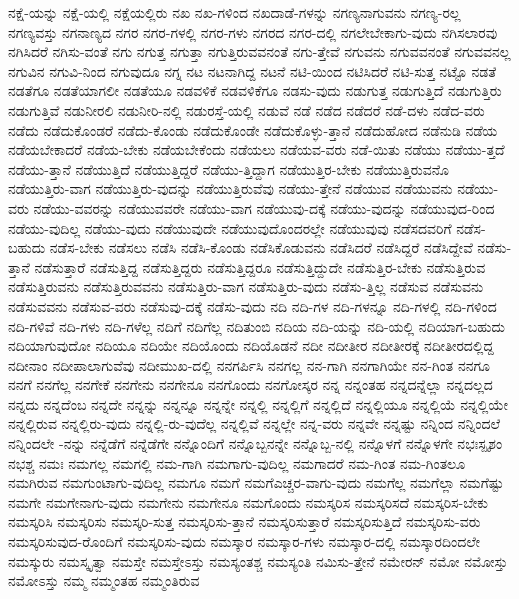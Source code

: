 {ನಕ್ಷೆ-ಯನ್ನು
ನಕ್ಷೆ-ಯಲ್ಲಿ
ನಕ್ಷೆಯಲ್ಲಿರು
ನಖ
ನಖ-ಗಳಿಂದ
ನಖದಾಡೆ-ಗಳನ್ನು
ನಗಣ್ಯನಾಗುವನು
ನಗಣ್ಯ-ರಲ್ಲ
ನಗಣ್ಯವಸ್ತು
ನಗನಾಣ್ಯದ
ನಗರ
ನಗರ-ಗಳಲ್ಲಿ
ನಗರ-ಗಳು
ನಗರದ
ನಗರ-ದಲ್ಲಿ
ನಗಲೇಬೇಕಾಗು-ವುದು
ನಗಿಸಲಾರವು
ನಗಿಸಿದರೆ
ನಗಿಸು-ವಂತೆ
ನಗು
ನಗುತ್ತ
ನಗುತ್ತಾ
ನಗುತ್ತಿರುವವನಂತೆ
ನಗು-ತ್ತೇವೆ
ನಗುವನು
ನಗುವವನಂತೆ
ನಗುವವನಲ್ಲ
ನಗುವಿನ
ನಗುವಿ-ನಿಂದ
ನಗುವುದೂ
ನಗ್ನ
ನಟ
ನಟನಾಗಿದ್ದ
ನಟನೆ
ನಟಿ-ಯಿಂದ
ನಟಿಸಿದರೆ
ನಟಿ-ಸುತ್ತ
ನಟ್ಟೊ
ನಡತೆ
ನಡತೆಗೂ
ನಡತೆಯಾಗಲೀ
ನಡತೆಯೂ
ನಡವಳಿಕೆ
ನಡವಳಿಕೆಗೂ
ನಡಸು-ವುದು
ನಡುಗುತ್ತ
ನಡುಗುತ್ತಿದೆ
ನಡುಗುತ್ತಿರು
ನಡುಗುತ್ತಿವೆ
ನಡುನೀರಲಿ
ನಡುನೀರಿ-ನಲ್ಲಿ
ನಡುರಸ್ತೆ-ಯಲ್ಲಿ
ನಡುವೆ
ನಡೆ
ನಡೆದ
ನಡೆದರೆ
ನಡೆ-ದಳು
ನಡೆದ-ವರು
ನಡೆದು
ನಡೆದುಕೊಂಡರೆ
ನಡೆದು-ಕೊಂಡು
ನಡೆದುಕೊಂಡೇ
ನಡೆದುಕೊಳ್ಳು-ತ್ತಾನೆ
ನಡೆದುಹೋದ
ನಡೆನುಡಿ
ನಡೆಯ
ನಡೆಯಬೇಕಾದರೆ
ನಡೆಯ-ಬೇಕು
ನಡೆಯಬೇಕೆಂದು
ನಡೆಯಲು
ನಡೆಯವ-ವರು
ನಡೆ-ಯಿತು
ನಡೆಯು
ನಡೆಯು-ತ್ತದೆ
ನಡೆಯು-ತ್ತಾನೆ
ನಡೆಯುತ್ತಿದೆ
ನಡೆಯುತ್ತಿದ್ದರೆ
ನಡೆಯು-ತ್ತಿದ್ದಾಗ
ನಡೆಯುತ್ತಿರ-ಬೇಕು
ನಡೆಯುತ್ತಿರುವನೊ
ನಡೆಯುತ್ತಿರು-ವಾಗ
ನಡೆಯುತ್ತಿರು-ವುದನ್ನು
ನಡೆಯುತ್ತಿರುವೆವು
ನಡೆಯು-ತ್ತೇನೆ
ನಡೆಯುವ
ನಡೆಯುವನು
ನಡೆಯು-ವರು
ನಡೆಯು-ವವರನ್ನು
ನಡೆಯುವವರೇ
ನಡೆಯು-ವಾಗ
ನಡೆಯುವು-ದಕ್ಕೆ
ನಡೆಯು-ವುದನ್ನು
ನಡೆಯುವುದ-ರಿಂದ
ನಡೆಯು-ವುದಿಲ್ಲ
ನಡೆಯು-ವುದು
ನಡೆಯುವುದೇ
ನಡೆಯುವುದೊಂದರಲ್ಲೇ
ನಡೆಯುವುವು
ನಡೆಸದವರಿಗೆ
ನಡೆಸ-ಬಹುದು
ನಡೆಸ-ಬೇಕು
ನಡೆಸಲು
ನಡೆಸಿ
ನಡೆಸಿ-ಕೊಂಡು
ನಡೆಸಿಕೊಡುವನು
ನಡೆಸಿದರೆ
ನಡೆಸಿದ್ದರೆ
ನಡೆಸಿದ್ದೇವೆ
ನಡೆಸು-ತ್ತಾನೆ
ನಡೆಸುತ್ತಾರೆ
ನಡೆಸುತ್ತಿದ್ದ
ನಡೆಸುತ್ತಿದ್ದರು
ನಡೆಸುತ್ತಿದ್ದರೂ
ನಡೆಸುತ್ತಿದ್ದುದೇ
ನಡೆಸುತ್ತಿರ-ಬೇಕು
ನಡೆಸುತ್ತಿರುವ
ನಡೆಸುತ್ತಿರುವನು
ನಡೆಸುತ್ತಿರುವವನು
ನಡೆಸುತ್ತಿರು-ವಾಗ
ನಡೆಸುತ್ತಿರು-ವುದು
ನಡೆಸು-ತ್ತಿಲ್ಲ
ನಡೆಸುವ
ನಡೆಸುವನು
ನಡೆಸುವವನು
ನಡೆಸುವ-ವರು
ನಡೆಸುವು-ದಕ್ಕೆ
ನಡೆಸು-ವುದು
ನದಿ
ನದಿ-ಗಳ
ನದಿ-ಗಳನ್ನೂ
ನದಿ-ಗಳಲ್ಲಿ
ನದಿ-ಗಳಿಂದ
ನದಿ-ಗಳಿವೆ
ನದಿ-ಗಳು
ನದಿ-ಗಳೆಲ್ಲ
ನದಿಗೆ
ನದಿಗೆಲ್ಲ
ನದಿತುಂಬಿ
ನದಿಯ
ನದಿ-ಯನ್ನು
ನದಿ-ಯಲ್ಲಿ
ನದಿಯಾಗ-ಬಹುದು
ನದಿಯಾಗುವುದೋ
ನದಿಯೂ
ನದಿಯೇ
ನದಿಯೊಂದು
ನದಿಯೊಡನೆ
ನದೀ
ನದೀತೀರ
ನದೀತೀರಕ್ಕೆ
ನದೀತೀರದಲ್ಲಿದ್ದ
ನದೀನಾಂ
ನದೀಪಾಲಾಗುವೆವು
ನದೀಮುಖ-ದಲ್ಲಿ
ನನಗರ್ಪಿಸಿ
ನನಗಲ್ಲ
ನನ-ಗಾಗಿ
ನನಗಾಗಿಯೇ
ನನ-ಗಿಂತ
ನನಗೂ
ನನಗೆ
ನನಗೆಲ್ಲ
ನನಗೇಕೆ
ನನಗೇನು
ನನಗೇನೂ
ನನಗೊಂದು
ನನಗೋಸ್ಕರ
ನನ್ನ
ನನ್ನಂತಹ
ನನ್ನದನ್ನೆಲ್ಲಾ
ನನ್ನದಲ್ಲದ
ನನ್ನದು
ನನ್ನದೆಂಬ
ನನ್ನದೇ
ನನ್ನನ್ನು
ನನ್ನನ್ನೂ
ನನ್ನನ್ನೇ
ನನ್ನಲ್ಲಿ
ನನ್ನಲ್ಲಿಗೆ
ನನ್ನಲ್ಲಿದೆ
ನನ್ನಲ್ಲಿಯೂ
ನನ್ನಲ್ಲಿಯೆ
ನನ್ನಲ್ಲಿಯೇ
ನನ್ನಲ್ಲಿರುವ
ನನ್ನಲ್ಲಿರು-ವುದು
ನನ್ನಲ್ಲಿ-ರು-ವುದೆಲ್ಲ
ನನ್ನಲ್ಲಿವೆ
ನನ್ನಲ್ಲೇ
ನನ್ನ-ವರು
ನನ್ನವೇ
ನನ್ನಷ್ಟು
ನನ್ನಿಂದ
ನನ್ನಿಂದಲೆ
ನನ್ನಿಂದಲೇ
-ನನ್ನು
ನನ್ನೆಡೆಗೆ
ನನ್ನೆಡೆಗೇ
ನನ್ನೊಂದಿಗೆ
ನನ್ನೊಬ್ಬನನ್ನೇ
ನನ್ನೊಬ್ಬ-ನಲ್ಲಿ
ನನ್ನೊಳಗೆ
ನನ್ನೊಳಗೇ
ನಭಃಸ್ಪೃಶಂ
ನಭಶ್ಚ
ನಮಃ
ನಮಗಲ್ಲ
ನಮಗಲ್ಲಿ
ನಮ-ಗಾಗಿ
ನಮಗಾಗು-ವುದಿಲ್ಲ
ನಮಗಾದರೆ
ನಮ-ಗಿಂತ
ನಮ-ಗಿಂತಲೂ
ನಮಗಿರುವ
ನಮಗುಂಟಾಗು-ವುದಿಲ್ಲ
ನಮಗೂ
ನಮಗೆ
ನಮಗೆಎಚ್ಚರ-ವಾಗು-ವುದು
ನಮಗೆಲ್ಲ
ನಮಗೆಲ್ಲಾ
ನಮಗೆಷ್ಟು
ನಮಗೇ
ನಮಗೇನಾಗು-ವುದು
ನಮಗೇನು
ನಮಗೇನೂ
ನಮಗೊಂದು
ನಮಸ್ಕರಿಸ
ನಮಸ್ಕರಿಸದೆ
ನಮಸ್ಕರಿಸ-ಬೇಕು
ನಮಸ್ಕರಿಸಿ
ನಮಸ್ಕರಿಸು
ನಮಸ್ಕರಿ-ಸುತ್ತ
ನಮಸ್ಕರಿಸು-ತ್ತಾನೆ
ನಮಸ್ಕರಿಸುತ್ತಾರೆ
ನಮಸ್ಕರಿಸುತ್ತಿದೆ
ನಮಸ್ಕರಿಸು-ವರು
ನಮಸ್ಕರಿಸುವುದ-ರೊಂದಿಗೆ
ನಮಸ್ಕರಿಸು-ವುದು
ನಮಸ್ಕಾರ
ನಮಸ್ಕಾರ-ಗಳು
ನಮಸ್ಕಾರ-ದಲ್ಲಿ
ನಮಸ್ಕಾರದಿಂದಲೇ
ನಮಸ್ಕುರು
ನಮಸ್ಕೃತ್ವಾ
ನಮಸ್ತೇ
ನಮಸ್ತೇಽಸ್ತು
ನಮಸ್ಯಂತಶ್ಚ
ನಮಸ್ಯಂತಿ
ನಮಿಸು-ತ್ತೇನೆ
ನಮೇರನ್
ನಮೋ
ನಮೋಸ್ತು
ನಮೋಽಸ್ತು
ನಮ್ಮ
ನಮ್ಮಂತಹ
ನಮ್ಮಂತಿರುವ
}
